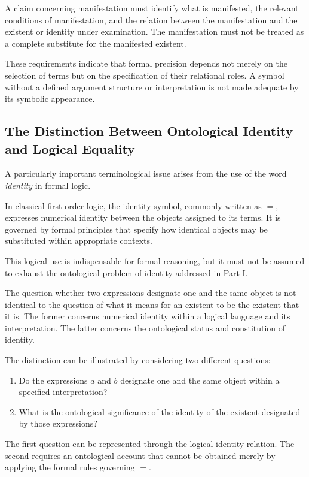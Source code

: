 A claim concerning manifestation must identify
what is manifested, the relevant conditions
of manifestation, and the relation between
the manifestation and the existent or identity
under examination. The manifestation must
not be treated as a complete substitute for
the manifested existent.

These requirements indicate that formal
precision depends not merely on the selection
of terms but on the specification of their
relational roles. A symbol without a defined
argument structure or interpretation is not
made adequate by its symbolic appearance.

\subsection{The Distinction Between Ontological Identity and Logical Equality}

A particularly important terminological issue
arises from the use of the word \emph{identity}
in formal logic.

In classical first-order logic, the identity
symbol, commonly written as \(=\), expresses
numerical identity between the objects assigned
to its terms. It is governed by formal principles
that specify how identical objects may be
substituted within appropriate contexts.

This logical use is indispensable for formal
reasoning, but it must not be assumed to exhaust
the ontological problem of identity addressed
in Part I.

The question whether two expressions designate
one and the same object is not identical to
the question of what it means for an existent
to be the existent that it is. The former
concerns numerical identity within a logical
language and its interpretation. The latter
concerns the ontological status and constitution
of identity.

The distinction can be illustrated by considering
two different questions:

\begin{enumerate}
    \item Do the expressions \(a\) and \(b\)
    designate one and the same object within
    a specified interpretation?

    \item What is the ontological significance
    of the identity of the existent designated
    by those expressions?
\end{enumerate}

The first question can be represented through
the logical identity relation. The second
requires an ontological account that cannot
be obtained merely by applying the formal
rules governing \(=\).

